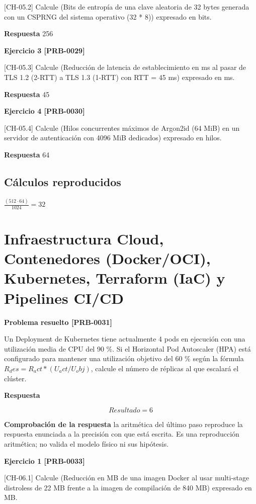 \documentclass{book}
\begin{document}
[CH-05.2] Calcule (Bits de entropía de una clave aleatoria de 32 bytes generada con un CSPRNG del sistema operativo (32 * 8)) expresado en bits.

\noindent\textbf{Respuesta} 256

\noindent\textbf{Ejercicio 3 [PRB-0029]}

[CH-05.3] Calcule (Reducción de latencia de establecimiento en ms al pasar de TLS 1.2 (2-RTT) a TLS 1.3 (1-RTT) con RTT = 45 ms) expresado en ms.

\noindent\textbf{Respuesta} 45

\noindent\textbf{Ejercicio 4 [PRB-0030]}

[CH-05.4] Calcule (Hilos concurrentes máximos de Argon2id (64 MiB) en un servidor de autenticación con 4096 MiB dedicados) expresado en hilos.

\noindent\textbf{Respuesta} 64

\subsection*{Cálculos reproducidos}

\(\frac{\left(512\cdot 64\right)}{1024} = 32\)

\section{Infraestructura Cloud, Contenedores (Docker/OCI), Kubernetes, Terraform (IaC) y Pipelines CI/CD}

\noindent\textbf{Problema resuelto [PRB-0031]}

Un Deployment de Kubernetes tiene actualmente 4 pods en ejecución con una utilización media de CPU del 90 \%. Si el Horizontal Pod Autoscaler (HPA) está configurado para mantener una utilización objetivo del 60 \% según la fórmula \(R_des = R_act * (U_act / U_obj)\), calcule el número de réplicas al que escalará el clúster.

\noindent\textbf{Respuesta}

\[
Resultado = 6
\]

\noindent\textbf{Comprobación de la respuesta} la aritmética del último paso reproduce la respuesta enunciada a la precisión con que está escrita. Es una reproducción aritmética; no valida el modelo físico ni sus hipótesis.

\noindent\textbf{Ejercicio 1 [PRB-0033]}

[CH-06.1] Calcule (Reducción en MB de una imagen Docker al usar multi-stage distroless de 22 MB frente a la imagen de compilación de 840 MB) expresado en MB.
\end{document}

